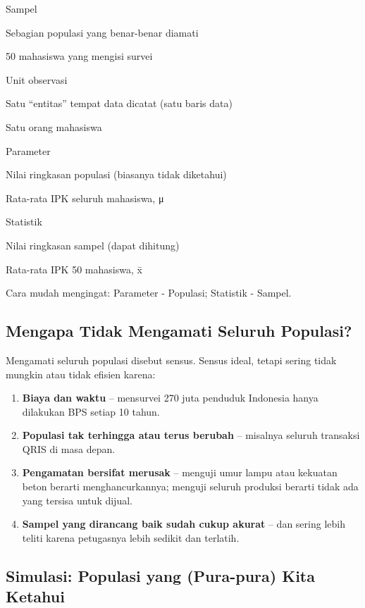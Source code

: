 \documentclass[
  indonesian,
  letterpaper,
]{book}
\providecommand{\tightlist}{%
  \setlength{\itemsep}{0pt}\setlength{\parskip}{0pt}}
\begin{document}
Sampel

Sebagian populasi yang benar-benar diamati

50 mahasiswa yang mengisi survei

Unit observasi

Satu ``entitas'' tempat data dicatat (satu baris data)

Satu orang mahasiswa

Parameter

Nilai ringkasan populasi (biasanya tidak diketahui)

Rata-rata IPK seluruh mahasiswa, μ

Statistik

Nilai ringkasan sampel (dapat dihitung)

Rata-rata IPK 50 mahasiswa, x̄

Cara mudah mengingat: Parameter - Populasi; Statistik - Sampel.

\subsection{Mengapa Tidak Mengamati Seluruh
Populasi?}\label{mengapa-tidak-mengamati-seluruh-populasi}

Mengamati seluruh populasi disebut sensus. Sensus ideal, tetapi sering
tidak mungkin atau tidak efisien karena:

\begin{enumerate}
\def\labelenumi{\arabic{enumi}.}
\tightlist
\item
  \textbf{Biaya dan waktu} -- mensurvei 270 juta penduduk Indonesia
  hanya dilakukan BPS setiap 10 tahun.
\item
  \textbf{Populasi tak terhingga atau terus berubah} -- misalnya seluruh
  transaksi QRIS di masa depan.
\item
  \textbf{Pengamatan bersifat merusak} -- menguji umur lampu atau
  kekuatan beton berarti menghancurkannya; menguji seluruh produksi
  berarti tidak ada yang tersisa untuk dijual.
\item
  \textbf{Sampel yang dirancang baik sudah cukup akurat} -- dan sering
  lebih teliti karena petugasnya lebih sedikit dan terlatih.
\end{enumerate}

\subsection{Simulasi: Populasi yang (Pura-pura) Kita
Ketahui}\label{simulasi-populasi-yang-pura-pura-kita-ketahui}
\end{document}
